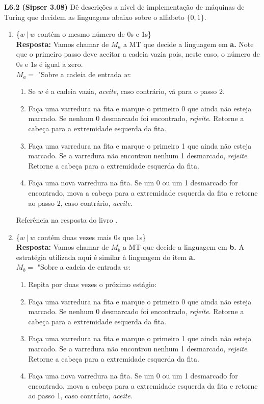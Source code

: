 
\noindent \textbf{L6.2 (Sipser 3.08)} Dê descrições a nível de implementação de máquinas de Turing que decidem as linguagens abaixo sobre o alfabeto $\{0, 1\}$.
\begin{enumerate}[label={\textbf{\alph*.}}]
\item \{$w\ |\ w$ contém o mesmo número de 0s e 1s\}\\[3pt]
\textbf{Resposta: } Vamos chamar de $M_a$ a MT que decide a linguagem em \textbf{a.} Note que o primeiro passo deve aceitar a cadeia vazia pois, neste caso, o número de 0s e 1s é igual a zero.\\[3pt]
$M_a = $ "Sobre a cadeia de entrada $w$:
\begin{enumerate}[label={\textbf{\arabic*.}}, leftmargin=1in]
\item Se $w$ é a cadeia vazia, \textit{aceite}, caso contrário, vá para o passo 2.
\item Faça uma varredura na fita e marque o primeiro 0 que ainda não esteja marcado. Se nenhum 0 desmarcado foi encontrado, \textit{rejeite}. Retorne a cabeça para a extremidade esquerda da fita.
\item Faça uma varredura na fita e marque o primeiro 1 que ainda não esteja marcado. Se a varredura não encontrou nenhum 1 desmarcado, \textit{rejeite}. Retorne a cabeça para a extremidade esquerda da fita.
\item Faça uma nova varredura na fita. Se um 0 ou um 1 desmarcado for encontrado, mova a cabeça para a extremidade esquerda da fita e retorne ao passo 2, caso contrário, \textit{aceite}.
\end{enumerate}
Referência na resposta do livro \cite{sipser:2006}.

\item \{$w\ |\ w$ contém duas vezes mais 0s que 1s\}\\[3pt]
\textbf{Resposta: } Vamos chamar de $M_b$ a MT que decide a linguagem em \textbf{b.} A estratégia utilizada aqui é similar à linguagem do item \textbf{a.}\\[3pt]
$M_b = $ "Sobre a cadeia de entrada $w$:
\begin{enumerate}[label={\textbf{\arabic*.}}, leftmargin=1in]
\item Repita por duas vezes o próximo estágio:
\item \begin{addmargin}[1em]{0em}
Faça uma varredura na fita e marque o primeiro 0 que ainda não esteja marcado. Se nenhum 0 desmarcado foi encontrado, \textit{rejeite}. Retorne a cabeça para a extremidade esquerda da fita.
\end{addmargin}
\item Faça uma varredura na fita e marque o primeiro 1 que ainda não esteja marcado. Se a varredura não encontrou nenhum 1 desmarcado, \textit{rejeite}. Retorne a cabeça para a extremidade esquerda da fita.
\item Faça uma nova varredura na fita. Se um 0 ou um 1 desmarcado for encontrado, mova a cabeça para a extremidade esquerda da fita e retorne ao passo 1, caso contrário, \textit{aceite}.


\end{enumerate}
\end{enumerate}
